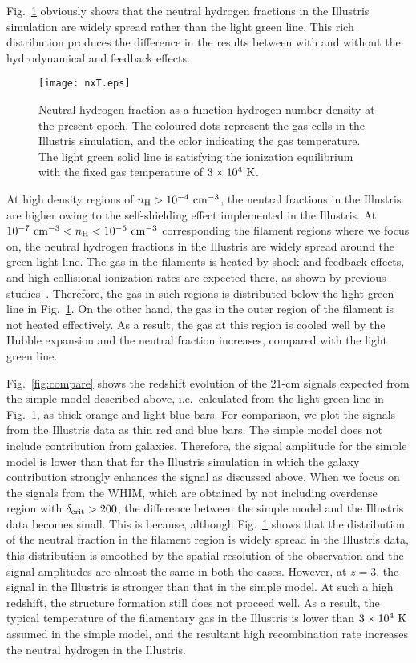 \documentclass[a4paper,fleqn,usenatbib,useAMS]{mnras}
\begin{document}
Fig.~\ref{fig:nxT} obviously shows that the neutral hydrogen fractions
in the Illustris simulation are widely spread rather than the light green
line. This rich distribution produces the difference in the results
between with and without the hydrodynamical and feedback effects.

\begin{figure}
 \texttt{[image: nxT.eps]}
 \caption{Neutral hydrogen fraction as a function hydrogen number
 density at the present epoch. 
 The coloured dots represent the gas cells in the Illustris simulation, and the color indicating the gas temperature. 
The light green solid line is satisfying the ionization equilibrium with the fixed gas temperature of $3\times 10^{4}~\rm{K}$. }
 \label{fig:nxT}
\end{figure}

At high density regions of  $n_{\rm H}>10^{-4}~{\rm cm^{-3}}$, the neutral fractions in the Illustris are higher owing to the self-shielding effect implemented in the Illustris. 
At $10^{-7}~{\rm cm^{-3}}< n_{\rm H} <10^{-5}~{\rm cm^{-3}}$
corresponding the filament regions where we focus on,
the neutral hydrogen fractions in the Illustris
are widely spread around the green light line.
The gas in the filaments is heated by shock and feedback effects, and high collisional ionization rates are expected there,
as shown by previous studies~\citep[e.g.][]{Cen1999, Dave2001,Yoshikawa2003, Bregman2007}.
Therefore, the gas in such regions is distributed below the light green
line in Fig.~\ref{fig:nxT}. On the other hand, the gas in the outer
region of the filament is not heated effectively. 
As a result, the gas at this region is cooled well by the Hubble expansion and the neutral
fraction increases, compared with the light green line. 

Fig.~\ref{fig:compare} shows the redshift evolution of the 21-cm signals expected from the simple model described above, i.e.~calculated from the light green line in Fig.~\ref{fig:nxT},
as thick orange and light blue bars.
For comparison, we plot the signals from the Illustris data as thin red
and blue bars.
The simple model does not include contribution from galaxies. 
Therefore, the signal amplitude for the simple model is lower than that for the Illustris simulation in which the galaxy contribution strongly enhances the signal as discussed above.
When we focus on the signals from the WHIM, which are obtained by not
including overdense region with $\delta_{\rm crit} >200$,
the difference between the simple model and the Illustris data becomes small. 
This is because, although Fig.~\ref{fig:nxT} shows that the distribution of the neutral fraction in the filament region is 
widely spread in the Illustris data,
this distribution is smoothed by the spatial resolution of the observation and the signal amplitudes are almost the same in both the cases.
However, at $z=3$, the signal in the Illustris is stronger than that in the simple model. 
At such a high redshift, the structure formation still does not proceed well. 
As a result, the typical temperature of the filamentary gas in the Illustris is lower than $3\times 10^{4}~\rm{K}$ assumed in the simple model, and the resultant high recombination rate increases the neutral hydrogen in the Illustris. 
\end{document}
